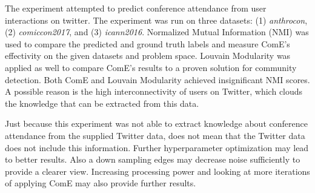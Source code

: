 \documentclass[sigconf]{acmart}
\begin{document}
The experiment attempted to predict conference attendance from user interactions on twitter. The experiment was run on three datasets: (1) \textit{anthrocon}, (2) \textit{comiccon2017}, and (3) \textit{icann2016}. Normalized Mutual Information (NMI) was used to compare the predicted and ground truth labels and measure ComE's effectivity on the given datasets and problem space. Louvain Modularity was applied as well to compare ComE's results to a proven solution for community detection. Both ComE and Louvain Modularity achieved insignificant NMI scores. A possible reason is the high interconnectivity of users on Twitter, which clouds the knowledge that can be extracted from this data.

Just because this experiment was not able to extract knowledge about conference attendance from the supplied Twitter data, does not mean that the Twitter data does not include this information. Further hyperparameter optimization may lead to better results. Also a down sampling edges may decrease noise sufficiently to provide a clearer view. Increasing processing power and looking at more iterations of applying ComE may also provide further results.



\end{document}

